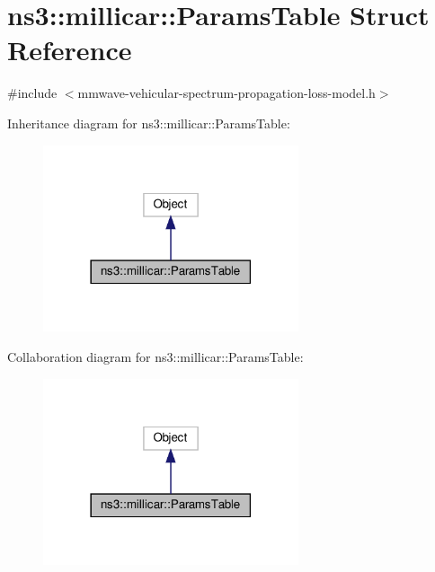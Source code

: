 \hypertarget{structns3_1_1millicar_1_1ParamsTable}{}\section{ns3\+:\+:millicar\+:\+:Params\+Table Struct Reference}
\label{structns3_1_1millicar_1_1ParamsTable}


{\ttfamily \#include $<$mmwave-\/vehicular-\/spectrum-\/propagation-\/loss-\/model.\+h$>$}



Inheritance diagram for ns3\+:\+:millicar\+:\+:Params\+Table\+:
\nopagebreak
\begin{figure}[H]
\begin{center}
\leavevmode
\includegraphics[width=213pt]{structns3_1_1millicar_1_1ParamsTable__inherit__graph}
\end{center}
\end{figure}


Collaboration diagram for ns3\+:\+:millicar\+:\+:Params\+Table\+:
\nopagebreak
\begin{figure}[H]
\begin{center}
\leavevmode
\includegraphics[width=213pt]{structns3_1_1millicar_1_1ParamsTable__coll__graph}
\end{center}
\end{figure}
